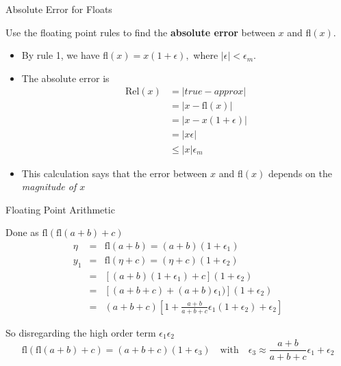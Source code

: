 \documentclass[10pt]{beamer}
\begin{document}
\begin{frame}{Absolute Error for Floats}
\begin{example}
    Use the floating point rules to find the \textbf{absolute error} between $x$ and fl$(x)$.
\end{example}

\begin{itemize}
    \item By rule 1, we have fl$(x)=x(1+\epsilon),$ where $|\epsilon|<\epsilon_m$.
    \item The absolute error is 
            \begin{align*}
            \mathrm{Rel}(x) &= {| true - approx|}\\ 
             &= {| x - \mathrm{fl}(x)|}\\ 
             &= | x - x(1+\epsilon)|\\  
              & = |  x\epsilon|\\
              &\le |x|\epsilon_m
        \end{align*}
    \item This calculation says that the error between $x$ and fl$(x)$ depends on the \textit{magnitude of $x$}
 \end{itemize}
\end{frame}
\begin{frame}{Floating Point Arithmetic}


\bigskip
Done as $ \mathrm{fl}( \mathrm{fl}(a+b) + c) $
\begin{eqnarray*} 
\eta & = & \mathrm{fl}(a+b) = (a+b)(1+\epsilon_1) \\
y_1  & = & \mathrm{fl}( \eta+ c) =  (\eta+c)(1+\epsilon_2) \\
     & = & \left[ (a+b)(1+\epsilon_1)   +c \right] (1+\epsilon_2) \\ 
     & = & \left[ (a+b +c) + (a+b) \epsilon_1)  \right] (1+\epsilon_2) \\ 
     & = &  (a+b +c) \left[1 + \frac{a+b}{a+b+c} \epsilon_1
(1+\epsilon_2) + \epsilon_2
  \right]
\end{eqnarray*}

So disregarding the high order term $\epsilon_1 \epsilon_2 $ 
\[ \mathrm{fl}( \mathrm{fl}(a+b) + c) = (a+b+c) (1 + \epsilon_3) 
\quad \mbox{with} \quad \epsilon_3 \approx \frac{a+b}{a+b+c} \epsilon_1 +
\epsilon_2\]
\end{frame}
\end{document}
